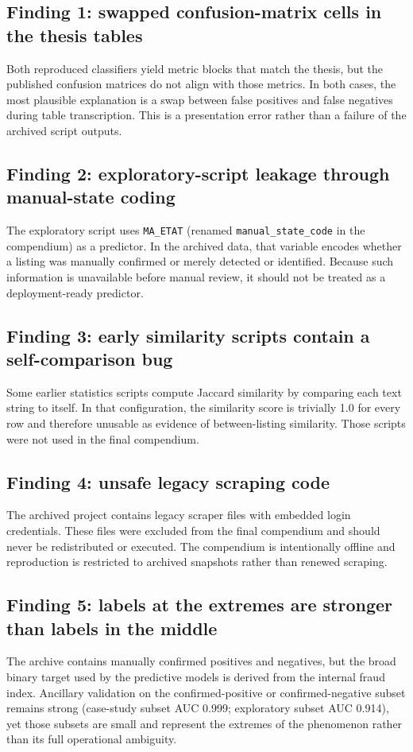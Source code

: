 \documentclass[11pt,a4paper]{article}
\begin{document}
\subsection{Finding 1: swapped confusion-matrix cells in the thesis tables}
Both reproduced classifiers yield metric blocks that match the thesis, but the published confusion matrices do not align with those metrics. In both cases, the most plausible explanation is a swap between false positives and false negatives during table transcription. This is a presentation error rather than a failure of the archived script outputs.

\subsection{Finding 2: exploratory-script leakage through manual-state coding}
The exploratory script uses \texttt{MA\_ETAT} (renamed \texttt{manual\_state\_code} in the compendium) as a predictor. In the archived data, that variable encodes whether a listing was manually confirmed or merely detected or identified. Because such information is unavailable before manual review, it should not be treated as a deployment-ready predictor.

\subsection{Finding 3: early similarity scripts contain a self-comparison bug}
Some earlier statistics scripts compute Jaccard similarity by comparing each text string to itself. In that configuration, the similarity score is trivially 1.0 for every row and therefore unusable as evidence of between-listing similarity. Those scripts were not used in the final compendium.

\subsection{Finding 4: unsafe legacy scraping code}
The archived project contains legacy scraper files with embedded login credentials. These files were excluded from the final compendium and should never be redistributed or executed. The compendium is intentionally offline and reproduction is restricted to archived snapshots rather than renewed scraping.

\subsection{Finding 5: labels at the extremes are stronger than labels in the middle}
The archive contains manually confirmed positives and negatives, but the broad binary target used by the predictive models is derived from the internal fraud index. Ancillary validation on the confirmed-positive or confirmed-negative subset remains strong (case-study subset AUC 0.999; exploratory subset AUC 0.914), yet those subsets are small and represent the extremes of the phenomenon rather than its full operational ambiguity.
\end{document}
